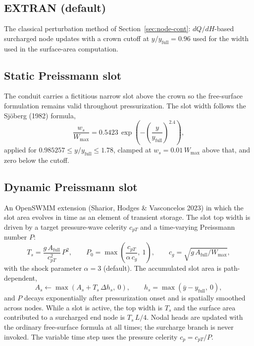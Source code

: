\documentclass[11pt,a4paper]{article}
\begin{document}
\subsection{EXTRAN (default)}

The classical perturbation method of Section~\ref{sec:node-cont}:
$dQ/dH$-based surcharged node updates with a crown cutoff at
$y/y_{\mathrm{full}} = 0.96$ used for the width used in the surface-area
computation.

\subsection{Static Preissmann slot}

The conduit carries a fictitious narrow slot above the crown so the free-surface
formulation remains valid throughout pressurization. The slot width follows the
Sj{\"o}berg (1982) formula,
\begin{equation}
  \frac{w_s}{W_{\max}} = 0.5423\,
  \exp\!\left(-\left(\frac{y}{y_{\mathrm{full}}}\right)^{2.4}\right),
\end{equation}
applied for $0.985257 \le y/y_{\mathrm{full}} \le 1.78$, clamped at
$w_s = 0.01\,W_{\max}$ above that, and zero below the cutoff.

\subsection{Dynamic Preissmann slot}

An OpenSWMM extension (Sharior, Hodges \& Vasconcelos 2023) in which the slot
area evolves in time as an element of transient storage. The slot top width is
driven by a target pressure-wave celerity $c_{pT}$ and a time-varying
Preissmann number $P$:
\begin{equation}
  T_s = \frac{g\,A_{\mathrm{full}}}{c_{pT}^{2}}\,P^{2},
  \qquad
  P_{0} = \max\!\left(\frac{c_{pT}}{\alpha\,c_g},\ 1\right),
  \qquad c_g = \sqrt{g\,A_{\mathrm{full}}/W_{\max}},
\end{equation}
with the shock parameter $\alpha = 3$ (default). The accumulated slot area is
path-dependent,
\begin{equation}
  A_s \leftarrow \max\!\left(A_s + T_s\,\Delta h_s,\ 0\right),
  \qquad h_s = \max(\bar y - y_{\mathrm{full}},\ 0),
\end{equation}
and $P$ decays exponentially after pressurization onset and is spatially
smoothed across nodes. While a slot is active, the top width is $T_s$ and the
surface area contributed to a surcharged end node is $T_s\,L/4$. Nodal heads
are updated with the ordinary free-surface formula at all times; the
surcharge branch is never invoked. The variable time step uses the pressure
celerity $c_p = c_{pT}/P$.
\end{document}
